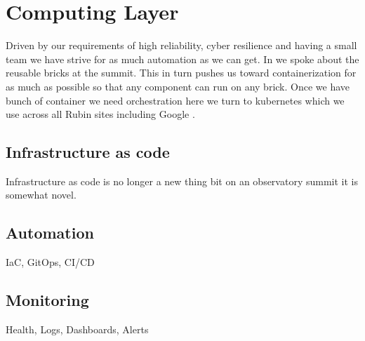\section{Computing Layer} \label{sec:computing}

Driven by our requirements of high reliability, cyber resilience and having a small team we have strive for as much automation as we can get.
In  we spoke about the reusable bricks at the summit.
This in turn pushes us toward containerization for as much as possible so that any component can run on any brick.
Once we have  bunch of container we need orchestration here we turn to kubernetes which we use across all Rubin sites including Google \citep{2021arXiv211115030O}.


\subsection{Infrastructure as code}
Infrastructure as code is no longer a new thing \citep{Morris2021IaC} bit on an observatory summit it is
somewhat novel.

\subsection{Automation}

IaC, GitOps, CI/CD

\subsection{Monitoring}
Health, Logs, Dashboards, Alerts

